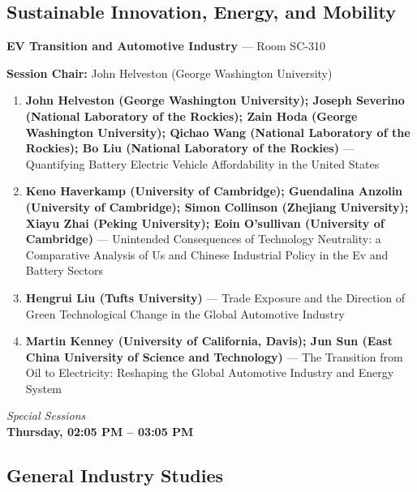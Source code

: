 \documentclass[
  10pt,
  letterpaper,
  DIV=11,
  numbers=noendperiod]{scrartcl}
\begin{document}
\subsection{\texorpdfstring{\textcolor{sustainability}{Sustainable Innovation, Energy, and Mobility}}{}}\label{section-37}

\textbf{EV Transition and Automotive Industry} --- Room SC-310

\textbf{Session Chair:} John Helveston (George Washington University)

\begin{enumerate}
\def\labelenumi{\arabic{enumi}.}
\item
  \textbf{John Helveston (George Washington University); Joseph Severino
  (National Laboratory of the Rockies); Zain Hoda (George Washington
  University); Qichao Wang (National Laboratory of the Rockies); Bo Liu
  (National Laboratory of the Rockies)} --- Quantifying Battery Electric
  Vehicle Affordability in the United States
\item
  \textbf{Keno Haverkamp (University of Cambridge); Guendalina Anzolin
  (University of Cambridge); Simon Collinson (Zhejiang University);
  Xiayu Zhai (Peking University); Eoin O'sullivan (University of
  Cambridge)} --- Unintended Consequences of Technology Neutrality: a
  Comparative Analysis of Us and Chinese Industrial Policy in the Ev and
  Battery Sectors
\item
  \textbf{Hengrui Liu (Tufts University)} --- Trade Exposure and the
  Direction of Green Technological Change in the Global Automotive
  Industry
\item
  \textbf{Martin Kenney (University of California, Davis); Jun Sun (East
  China University of Science and Technology)} --- The Transition from
  Oil to Electricity: Reshaping the Global Automotive Industry and
  Energy System
\end{enumerate}

\newpage


\begin{center}
\normalsize\textit{Special Sessions}\\[0.3em]
\Large\textbf{Thursday, 02:05 PM – 03:05 PM}
\end{center}

\subsection{\texorpdfstring{\textcolor{gis}{General Industry Studies}}{}}\label{section-38}
\end{document}
